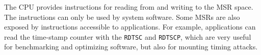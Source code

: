 The CPU provides instructions for reading from and writing to the MSR space.
The instructions can only be used by system software. Some MSRs are also
exposed by instructions accessible to applications. For example, applications
can read the time-stamp counter with the \texttt{RDTSC} and \texttt{RDTSCP},
which are very useful for benchmarking and optimizing software, but also for
mounting timing attacks.

%
